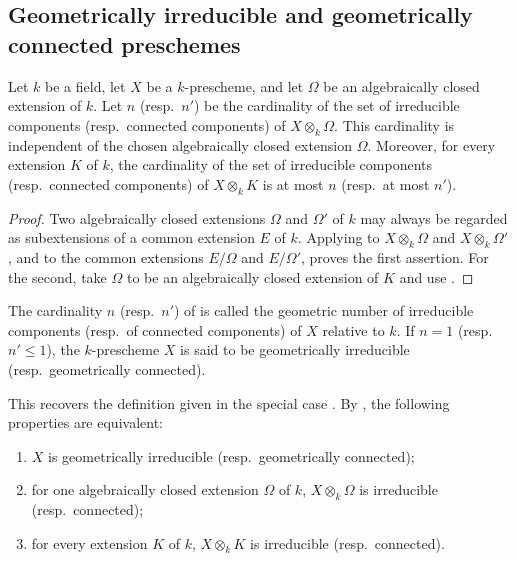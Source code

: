 \subsection{Geometrically irreducible and geometrically connected preschemes}
\label{subsection:IV.4.5}
\label{IV.4.5}

\begin{proposition}[4.5.1]
\label{IV.4.5.1}
Let $k$ be a field, let $X$ be a $k$-prescheme, and let $\Omega$ be an
algebraically closed extension of $k$.
Let $n$ \textup{(resp.\ }$n'$\textup{)} be the cardinality of the set of irreducible
components \textup{(resp.\ }connected components\textup{)} of $X\otimes_k\Omega$.
This cardinality is independent of the chosen algebraically closed
extension $\Omega$.
Moreover, for every extension $K$ of $k$, the cardinality of the set of
irreducible components \textup{(resp.\ }connected components\textup{)} of $X\otimes_k K$
is at most $n$ \textup{(resp.\ }at most $n'$\textup{)}.
\end{proposition}

\begin{proof}
Two algebraically closed extensions $\Omega$ and $\Omega'$ of $k$ may
always be regarded as subextensions of a common extension $E$ of $k$.
Applying  to $X\otimes_k\Omega$ and
$X\otimes_k\Omega'$, and to the common extensions $E/\Omega$ and
$E/\Omega'$, proves the first assertion.
For the second, take $\Omega$ to be an algebraically closed extension of
$K$ and use .
\end{proof}

\begin{definition}[4.5.2]
\label{IV.4.5.2}
The cardinality $n$ (resp.\ $n'$) of  is called the
geometric number of irreducible components
(resp.\ of connected components) of $X$ relative to $k$.
If $n=1$ (resp.\ $n'\leq 1$), the $k$-prescheme $X$ is said to be
geometrically irreducible (resp.\ geometrically
connected).
\end{definition}

This recovers the definition given in the special case
.
By , the following properties are equivalent:
\begin{enumerate}
\item[\rm(a)]
\label{IV.4.5.2.a}
$X$ is geometrically irreducible (resp.\ geometrically connected);

\item[\rm(b)]
\label{IV.4.5.2.b}
for one algebraically closed extension $\Omega$ of $k$,
$X\otimes_k\Omega$ is irreducible (resp.\ connected);

\item[\rm(c)]
\label{IV.4.5.2.c}
for every extension $K$ of $k$, $X\otimes_k K$ is irreducible
(resp.\ connected).
\end{enumerate}

